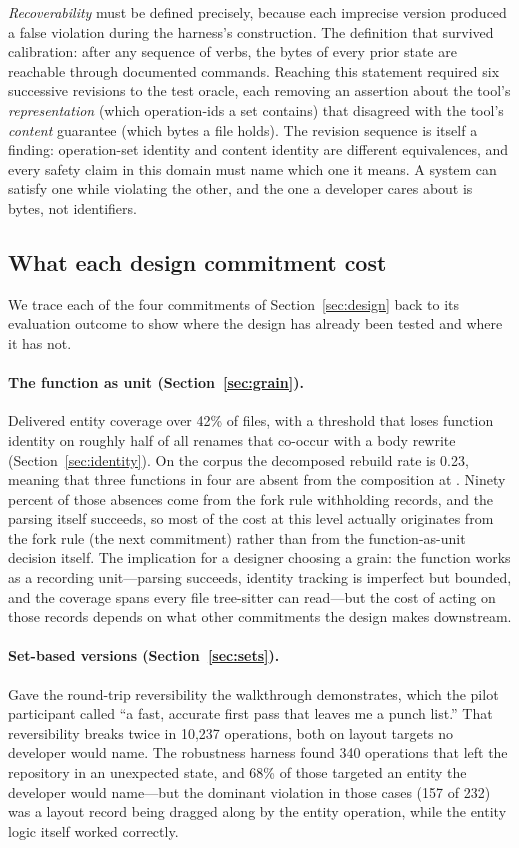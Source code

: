\emph{Recoverability} must be defined precisely, because each imprecise version
produced a false violation during the harness's construction. The definition that
survived calibration: after any sequence of verbs, the bytes of every prior state
are reachable through documented commands. Reaching this statement required six
successive revisions to the test oracle, each removing an assertion about the
tool's \emph{representation} (which operation-ids a set contains) that disagreed
with the tool's \emph{content} guarantee (which bytes a file holds). The revision
sequence is itself a finding: operation-set identity and content identity are
different equivalences, and every safety claim in this domain must name which one
it means. A system can satisfy one while violating the other, and the one a
developer cares about is bytes, not identifiers.

\subsection{What each design commitment cost}
\label{sec:design-cost}

We trace each of the four commitments of Section~\ref{sec:design} back to its
evaluation outcome to show where the design has already been tested and where
it has not.

\paragraph{The function as unit (Section~\ref{sec:grain}).}
Delivered entity coverage over 42\% of files, with a threshold that loses
function identity on roughly half of all renames that co-occur with a body
rewrite (Section~\ref{sec:identity}). On the corpus the decomposed
rebuild rate is 0.23, meaning that three functions in four are absent from
the composition at . Ninety percent of those absences come from the
fork rule withholding records, and the parsing itself succeeds, so most of the
cost at this level actually originates from the fork rule (the next commitment)
rather than from the function-as-unit decision itself. The implication for a
designer choosing a grain: the function works as a recording unit---parsing
succeeds, identity tracking is imperfect but bounded, and the coverage spans
every file tree-sitter can read---but the cost of acting on those records
depends on what other commitments the design makes downstream.

\paragraph{Set-based versions (Section~\ref{sec:sets}).}
Gave the round-trip reversibility the walkthrough demonstrates, which the pilot
participant called ``a fast, accurate first pass that leaves me a punch list.''
That reversibility breaks twice in 10{,}237 operations, both on layout targets
no developer would name. The robustness harness found 340 operations that left
the repository in an unexpected state, and 68\% of those targeted an entity the
developer would name---but the dominant violation in those cases (157 of 232) was
a layout record being dragged along by the entity operation, while the entity
logic itself worked correctly.

